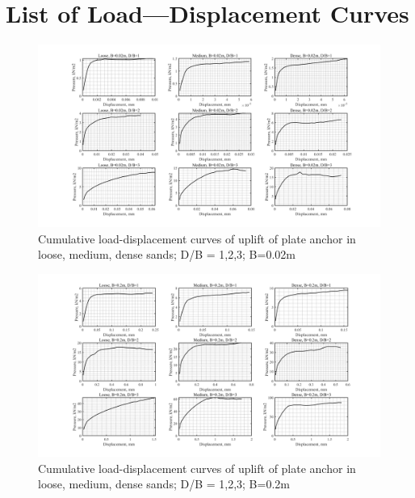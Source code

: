 \documentclass[a4paper, nobind]{templates/ociamthesis}
\begin{document}
\begin{landscape}

\hypertarget{list-of-loaddisplacement-curves}{%
\chapter{List of Load---Displacement Curves}\label{list-of-loaddisplacement-curves}}

\begin{figure}[H]
\includegraphics[width=1\linewidth]{myfigureeeeee/CodeA} \caption{Cumulative load-displacement curves of uplift of plate anchor in loose, medium, dense sands; D/B = 1,2,3; B=0.02m }\label{fig:unnamed-chunk-48}
\end{figure}

\begin{figure}[H]
\includegraphics[width=1\linewidth]{myfigureeeeee/CodeB} \caption{Cumulative load-displacement curves of uplift of plate anchor in loose, medium, dense sands; D/B = 1,2,3; B=0.2m}\label{fig:unnamed-chunk-49}
\end{figure}


\end{landscape}
\end{document}

